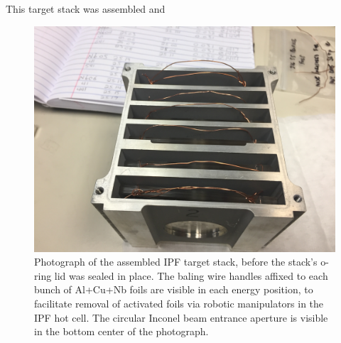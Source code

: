 \documentclass[3p]{elsarticle}
\begin{document}
This target stack was assembled and 



\begin{figure}[h]
 \centering
 \includegraphics[scale=0.1,clip=true,trim=13cm 0cm 3cm 6cm]{./figures/IMG_1975.JPG}
 \caption{Photograph of the assembled IPF target stack, before the stack's o-ring lid was sealed in place. The baling wire handles affixed to each bunch of Al+Cu+Nb foils are visible in each energy position, to facilitate removal of activated foils via robotic manipulators in the IPF hot cell. The circular Inconel beam entrance aperture is visible in the bottom center of the photograph.  }
 \label{fig:target_stack}
\end{figure}
\end{document}
